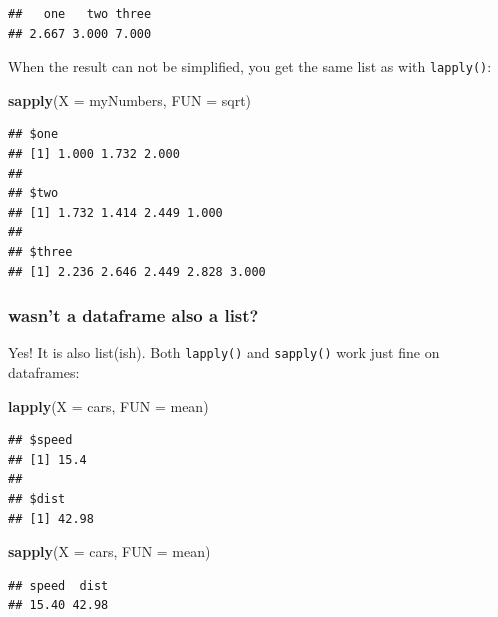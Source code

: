 \documentclass[]{book}
\newenvironment{Shaded}{\begin{snugshade}}{\end{snugshade}}
\newcommand{\DataTypeTok}[1]{\textcolor[rgb]{0.13,0.29,0.53}{#1}}
\newcommand{\KeywordTok}[1]{\textcolor[rgb]{0.13,0.29,0.53}{\textbf{#1}}}
\newcommand{\NormalTok}[1]{#1}
\begin{document}
\begin{verbatim}
##   one   two three 
## 2.667 3.000 7.000
\end{verbatim}

When the result can not be simplified, you get the same list as with \texttt{lapply()}:

\begin{Shaded}
\begin{Highlighting}[]
\KeywordTok{sapply}\NormalTok{(}\DataTypeTok{X =}\NormalTok{ myNumbers, }\DataTypeTok{FUN =}\NormalTok{ sqrt)}
\end{Highlighting}
\end{Shaded}

\begin{verbatim}
## $one
## [1] 1.000 1.732 2.000
## 
## $two
## [1] 1.732 1.414 2.449 1.000
## 
## $three
## [1] 2.236 2.646 2.449 2.828 3.000
\end{verbatim}

\hypertarget{wasnt-a-dataframe-also-a-list}{%
\subsubsection{wasn't a dataframe also a list?}\label{wasnt-a-dataframe-also-a-list}}

Yes! It is also list(ish). Both \texttt{lapply()} and \texttt{sapply()} work just fine on dataframes:

\begin{Shaded}
\begin{Highlighting}[]
\KeywordTok{lapply}\NormalTok{(}\DataTypeTok{X =}\NormalTok{ cars, }\DataTypeTok{FUN =}\NormalTok{ mean)}
\end{Highlighting}
\end{Shaded}

\begin{verbatim}
## $speed
## [1] 15.4
## 
## $dist
## [1] 42.98
\end{verbatim}

\begin{Shaded}
\begin{Highlighting}[]
\KeywordTok{sapply}\NormalTok{(}\DataTypeTok{X =}\NormalTok{ cars, }\DataTypeTok{FUN =}\NormalTok{ mean) }
\end{Highlighting}
\end{Shaded}

\begin{verbatim}
## speed  dist 
## 15.40 42.98
\end{verbatim}
\end{document}
